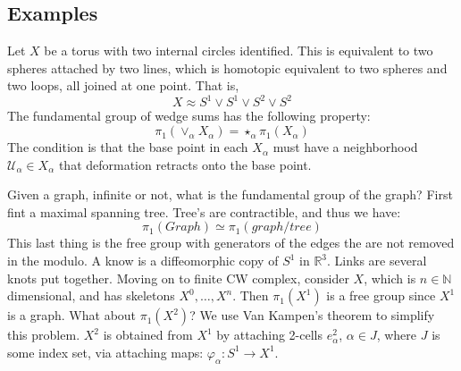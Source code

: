 \documentclass[crop=false,class=book,oneside]{standalone}
\begin{document}
        \subsection{Examples}
            \begin{lexample}
                Let $X$ be a torus with two internal circles
                identified. This is equivalent to two spheres
                attached by two lines, which is homotopic equivalent
                to two spheres and two loops, all joined at one
                point. That is,
                \begin{equation}
                    X\approx{S}^{1}\lor{S}^{1}\lor{S}^{2}\lor{S}^{2}
                \end{equation}
                The fundamental group of wedge sums has the
                following property:
                \begin{equation}
                    \pi_{1}(\lor_{\alpha}X_{\alpha})=
                    \star_{\alpha}\pi_{1}(X_{\alpha})
                \end{equation}
                The condition is that the base point in each
                $X_{\alpha}$ must have a neighborhood
                $\mathcal{U}_{\alpha}\in{X}_{\alpha}$ that
                deformation retracts onto the base point.
            \end{lexample}
            Given a graph, infinite or not, what is the fundamental
            group of the graph? First fint a maximal spanning
            tree. Tree's are contractible, and thus we have:
            \begin{equation}
                \pi_{1}(Graph)\simeq\pi_{1}(graph/tree)
            \end{equation}
            This last thing is the free group with generators of
            the edges the are not removed in the modulo.
            A know is a diffeomorphic copy of $S^{1}$ in
            $\mathbb{R}^{3}$. Links are several knots put together.
            Moving on to finite CW complex, consider $X$, which
            is $n\in\mathbb{N}$ dimensional, and has skeletons
            $X^{0},\dots,X^{n}$. Then $\pi_{1}(X^{1})$ is a
            free group since $X^{1}$ is a graph. What about
            $\pi_{1}(X^{2})$? We use Van Kampen's theorem to
            simplify this problem. $X^{2}$ is obtained from
            $X^{1}$ by attaching 2-cells $e_{\alpha}^{2}$,
            $\alpha\in{J}$, where $J$ is some index set, via
            attaching maps:
            $\varphi_{\alpha}:S^{1}\rightarrow{X}^{1}$.
\end{document}
